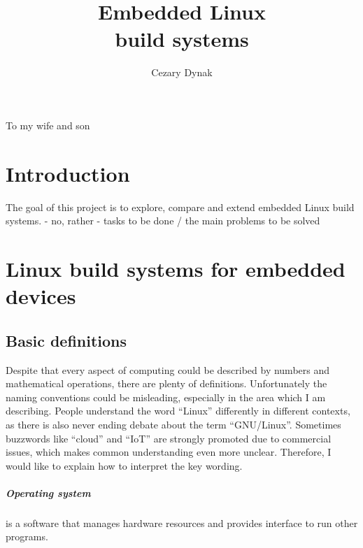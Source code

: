 \documentclass[printmode]{mgr}
\title{Embedded Linux \\ build systems}
\author{Cezary Dynak}
\begin{document}


\maketitle
\dedication{6cm}{To my wife and son}

\tableofcontents

\chapter*{Introduction}

The goal of this project is to explore, compare and extend embedded Linux build systems. - no, rather - tasks to be done / the main problems to be solved



\chapter{Linux build systems for embedded devices}
\label{chapter:build systems}

\section{Basic definitions}

Despite that every aspect of computing could be described by numbers and mathematical operations, there are plenty of definitions. Unfortunately the naming conventions could be misleading, especially in the area which I am describing. People understand the word ``Linux'' differently in different contexts, as there is also never ending debate about the term ``GNU/Linux''. Sometimes buzzwords like ``cloud'' and ``IoT'' are strongly promoted due to commercial issues, which makes common understanding even more unclear. Therefore, I would like to explain how to interpret the key wording.

\paragraph{Operating system} is a software that manages hardware resources and provides interface to run other programs.
\end{document}
